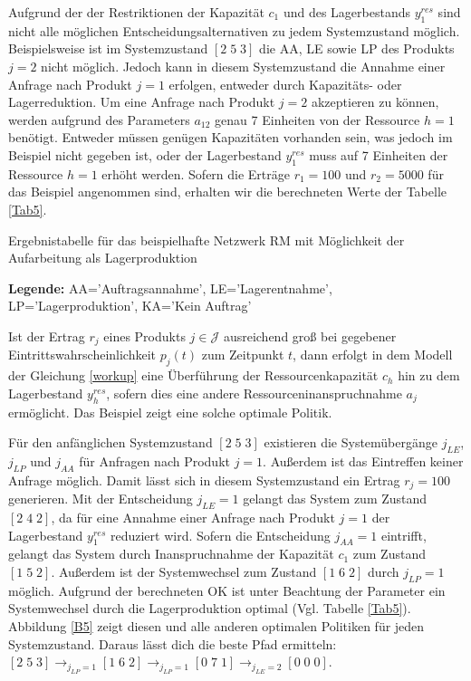 Aufgrund der der Restriktionen der Kapazität $c_{1}$ und des Lagerbestands $y_{1}^{res}$ sind nicht alle möglichen Entscheidungsalternativen zu jedem Systemzustand möglich. Beispielsweise ist im Systemzustand $[2\;5\;3]$ die AA, LE sowie LP des Produkts $j=2$ nicht möglich. Jedoch kann in diesem Systemzustand die Annahme einer Anfrage nach Produkt $j=1$ erfolgen, entweder durch Kapazitäts- oder Lagerreduktion. Um eine Anfrage nach Produkt $j=2$ akzeptieren zu können, werden aufgrund des Parameters $a_{12}$ genau 7 Einheiten von der Ressource $h=1$ benötigt. Entweder müssen genügen Kapazitäten vorhanden sein, was jedoch im Beispiel nicht gegeben ist, oder der Lagerbestand $y_{1}^{res}$ muss auf 7 Einheiten der Ressource $h=1$ erhöht werden. Sofern die Erträge $r_{1}=100$ und $r_{2}=5000$ für das Beispiel angenommen sind, erhalten wir die berechneten Werte der Tabelle \ref{Tab5}.
\begin{table}
\begin{footnotesize}
    \caption{Ergebnistabelle für das beispielhafte Netzwerk RM mit Möglichkeit der Aufarbeitung als Lagerproduktion} \label{Tab5}
    \vspace*{3mm}
    \begin{center}
      {\footnotesize \textbf{Legende:} AA='Auftragsannahme', LE='Lagerentnahme', LP='Lagerproduktion', KA='Kein Auftrag'} 
      \end{center}
\end{footnotesize}
\end{table}

Ist der Ertrag $r_{j}$ eines Produkts $j\in\mathcal{J}$ ausreichend groß bei gegebener Eintrittswahrscheinlichkeit $p_{j}(t)$ zum Zeitpunkt $t$, dann erfolgt in dem Modell der Gleichung \eqref{workup} eine Überführung der Ressourcenkapazität $c_{h}$ hin zu dem Lagerbestand $y_{h}^{res}$, sofern dies eine andere Ressourceninanspruchnahme $a_{j}$ ermöglicht. Das Beispiel zeigt eine solche optimale Politik.

Für den anfänglichen Systemzustand $[2\;5\;3]$ existieren die Systemübergänge $j_{LE}$, $j_{LP}$ und $j_{AA}$ für Anfragen nach Produkt $j=1$. Außerdem ist das Eintreffen keiner Anfrage möglich. Damit lässt sich in diesem Systemzustand ein Ertrag $r_{j}=100$ generieren. Mit der Entscheidung $j_{LE}=1$ gelangt das System zum Zustand $[2\;4\;2]$, da für eine Annahme einer Anfrage nach Produkt $j=1$ der Lagerbestand $y_{1}^{res}$ reduziert wird. Sofern die Entscheidung $j_{AA}=1$ eintrifft, gelangt das System durch Inanspruchnahme der Kapazität $c_{1}$ zum Zustand $[1\;5\;2]$. Außerdem ist der Systemwechsel zum Zustand $[1\;6\;2]$ durch $j_{LP}=1$ möglich. Aufgrund der berechneten OK ist unter Beachtung der Parameter ein Systemwechsel durch die Lagerproduktion optimal (Vgl. Tabelle \ref{Tab5}). Abbildung \ref{B5} zeigt diesen und alle anderen optimalen Politiken für jeden Systemzustand. Daraus lässt dich die beste Pfad ermitteln:  $[2\;5\;3] \rightarrow_{j_{LP}=1} [1\;6\;2] \rightarrow_{j_{LP}=1} [0\;7\;1] \rightarrow_{j_{LE}=2} [0\;0\;0]$.

